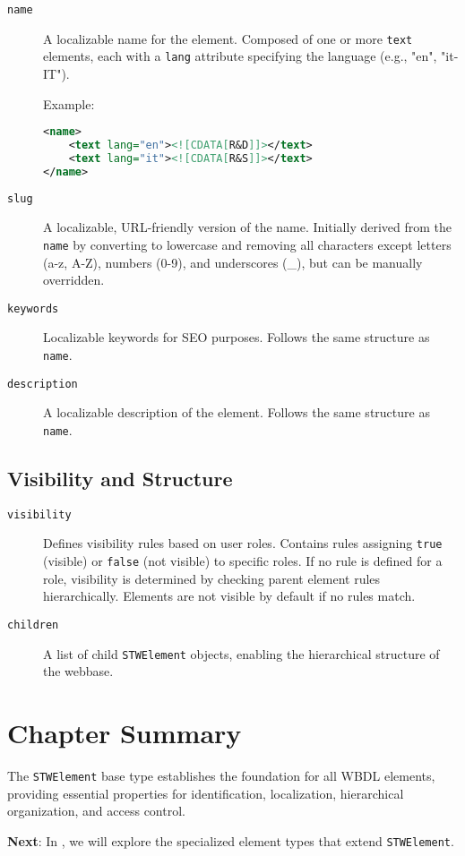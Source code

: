 \begin{description}
\item[\texttt{name}] A localizable name for the element. Composed of one or more \texttt{text} elements, each with a \texttt{lang} attribute specifying the language (e.g., "en", "it-IT"). 

Example:
\begin{lstlisting}[language=XML]
<name>
    <text lang="en"><![CDATA[R&D]]></text>
    <text lang="it"><![CDATA[R&S]]></text>
</name>
\end{lstlisting}

\item[\texttt{slug}] A localizable, URL-friendly version of the name. Initially derived from the \texttt{name} by converting to lowercase and removing all characters except letters (a-z, A-Z), numbers (0-9), and underscores (\_), but can be manually overridden.

\item[\texttt{keywords}] Localizable keywords for SEO purposes. Follows the same structure as \texttt{name}.

\item[\texttt{description}] A localizable description of the element. Follows the same structure as \texttt{name}.
\end{description}

\subsection{Visibility and Structure}

\begin{description}
\item[\texttt{visibility}] Defines visibility rules based on user roles. Contains rules assigning \texttt{true} (visible) or \texttt{false} (not visible) to specific roles. If no rule is defined for a role, visibility is determined by checking parent element rules hierarchically. Elements are not visible by default if no rules match.

\item[\texttt{children}] A list of child \texttt{STWElement} objects, enabling the hierarchical structure of the webbase.
\end{description}

\section{Chapter Summary}

The \texttt{STWElement} base type establishes the foundation for all WBDL elements, providing essential properties for identification, localization, hierarchical organization, and access control.

\textbf{Next}: In , we will explore the specialized element types that extend \texttt{STWElement}.
